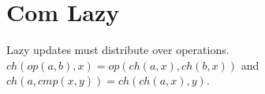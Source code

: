\section{Com Lazy}
Lazy updates must distribute over operations. $ch(op(a,b),x) = op(ch(a,x),ch(b,x))$ and $ch(a,cmp(x,y)) = ch(ch(a,x),y)$.
